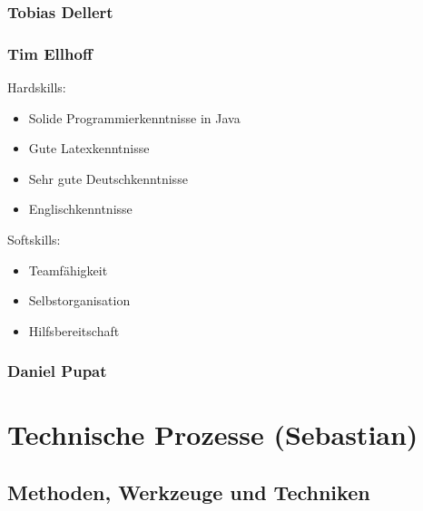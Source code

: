 \documentclass[fontsize=12pt,paper=a4,twoside]{scrartcl}
\begin{document}
\subsubsection{Tobias Dellert}

\subsubsection{Tim Ellhoff}

Hardskills:
\begin{itemize}
\item Solide Programmierkenntnisse in Java
\item Gute Latexkenntnisse
\item Sehr gute Deutschkenntnisse
\item Englischkenntnisse
\end{itemize}

Softskills: 
\begin{itemize}
\item Teamfähigkeit
\item Selbstorganisation
\item Hilfsbereitschaft
\end{itemize}




\subsubsection{Daniel Pupat}


\section{Technische Prozesse (Sebastian)}
\subsection{Methoden, Werkzeuge und Techniken}
\end{document}
